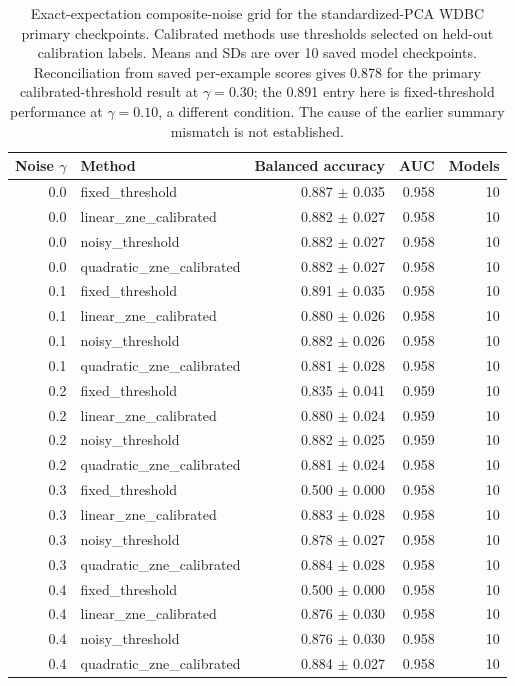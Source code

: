 \documentclass[10pt]{article}
\begin{document}
\begin{table}[H]\centering\scriptsize
\caption{Exact-expectation composite-noise grid for the standardized-PCA WDBC primary checkpoints. Calibrated methods use thresholds selected on held-out calibration labels. Means and SDs are over 10 saved model checkpoints. Reconciliation from saved per-example scores gives 0.878 for the primary calibrated-threshold result at $\gamma=0.30$; the 0.891 entry here is fixed-threshold performance at $\gamma=0.10$, a different condition. The cause of the earlier summary mismatch is not established.}
\label{tab:stdnoise}
\begin{tabular}{@{}r l r r r@{}}\toprule
Noise $\gamma$ & Method & Balanced accuracy & AUC & Models \\ \midrule
0.0 & fixed\_threshold & 0.887 $\pm$ 0.035 & 0.958 & 10 \\
0.0 & linear\_zne\_calibrated & 0.882 $\pm$ 0.027 & 0.958 & 10 \\
0.0 & noisy\_threshold & 0.882 $\pm$ 0.027 & 0.958 & 10 \\
0.0 & quadratic\_zne\_calibrated & 0.882 $\pm$ 0.027 & 0.958 & 10 \\
0.1 & fixed\_threshold & 0.891 $\pm$ 0.035 & 0.958 & 10 \\
0.1 & linear\_zne\_calibrated & 0.880 $\pm$ 0.026 & 0.958 & 10 \\
0.1 & noisy\_threshold & 0.882 $\pm$ 0.026 & 0.958 & 10 \\
0.1 & quadratic\_zne\_calibrated & 0.881 $\pm$ 0.028 & 0.958 & 10 \\
0.2 & fixed\_threshold & 0.835 $\pm$ 0.041 & 0.959 & 10 \\
0.2 & linear\_zne\_calibrated & 0.880 $\pm$ 0.024 & 0.959 & 10 \\
0.2 & noisy\_threshold & 0.882 $\pm$ 0.025 & 0.959 & 10 \\
0.2 & quadratic\_zne\_calibrated & 0.881 $\pm$ 0.024 & 0.958 & 10 \\
0.3 & fixed\_threshold & 0.500 $\pm$ 0.000 & 0.958 & 10 \\
0.3 & linear\_zne\_calibrated & 0.883 $\pm$ 0.028 & 0.958 & 10 \\
0.3 & noisy\_threshold & 0.878 $\pm$ 0.027 & 0.958 & 10 \\
0.3 & quadratic\_zne\_calibrated & 0.884 $\pm$ 0.028 & 0.958 & 10 \\
0.4 & fixed\_threshold & 0.500 $\pm$ 0.000 & 0.958 & 10 \\
0.4 & linear\_zne\_calibrated & 0.876 $\pm$ 0.030 & 0.958 & 10 \\
0.4 & noisy\_threshold & 0.876 $\pm$ 0.030 & 0.958 & 10 \\
0.4 & quadratic\_zne\_calibrated & 0.884 $\pm$ 0.027 & 0.958 & 10 \\
\bottomrule\end{tabular}\end{table}
\end{document}
